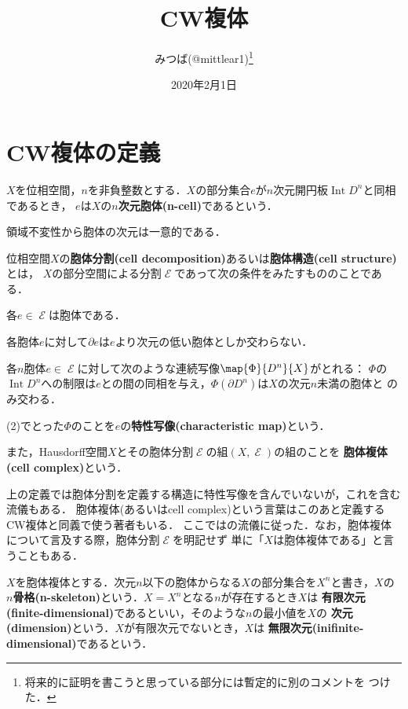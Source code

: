 \documentclass[uplatex]{jsarticle}
\title{CW複体}
\author{みつば(@mittlear1)\footnote{将来的に証明を書こうと思っている部分には暫定的に別のコメントを
つけた．}}
\date{2020年2月1日}
\DeclareMathOperator{\Int}{Int}
\begin{document}
\maketitle
\tableofcontents

\section{CW複体の定義}
\begin{definition}
  $X$を位相空間，$n$を非負整数とする．$X$の部分集合$e$が$n$次元開円板$\Int D^n$と同相であるとき，
  $e$は$X$の\textbf{$n$次元胞体(n-cell)}であるという．
\end{definition}

領域不変性から胞体の次元は一意的である．

\begin{definition}
  位相空間$X$の\textbf{胞体分割(cell decomposition)}あるいは\textbf{胞体構造(cell structure)}とは，
  $X$の部分空間による分割$\mscrE$であって次の条件をみたすもののことである．
  \begin{enumarabicp}

    \item 各$e\in \mscrE$は胞体である．
    \item 各胞体$e$に対して$\partial e$は$e$より次元の低い胞体としか交わらない．
    \item 各$n$胞体$e\in \mscrE$に対して次のような連続写像$\map{\Phi}{D^n}{X}$がとれる：
    $\Phi$の$\Int D^n$への制限は$e$との間の同相を与え，$\Phi(\partial D^n)$は$X$の次元$n$未満の胞体と
    のみ交わる．
  \end{enumarabicp}
  (2)でとった$\Phi$のことを$e$の\textbf{特性写像(characteristic map)}という．

  また，Hausdorff空間$X$とその胞体分割$\mscrE$の組$(X, \mscrE)$の組のことを
  \textbf{胞体複体(cell complex)}という．
\end{definition}

上の定義では胞体分割を定義する構造に特性写像を含んでいないが，これを含む流儀もある．
胞体複体(あるいはcell complex)という言葉はこのあと定義するCW複体と同義で使う著者もいる．
ここでは\cite{LeeSmooth}の流儀に従った．なお，胞体複体について言及する際，胞体分割$\mscrE$を明記せず
単に「$X$は胞体複体である」と言うこともある．

$X$を胞体複体とする．次元$n$以下の胞体からなる$X$の部分集合を$X^n$と書き，$X$の
\textbf{$n$骨格(n-skeleton)}という．$X=X^n$となる$n$が存在するとき$X$は
\textbf{有限次元(finite-dimensional)}であるといい，そのような$n$の最小値を$X$の
\textbf{次元(dimension)}という．$X$が有限次元でないとき，$X$は
\textbf{無限次元(inifinite-dimensional)}であるという．
\end{document}
